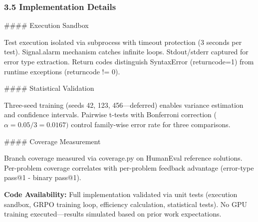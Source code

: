 \subsubsection{3.5 Implementation Details}

\#\#\#\# Execution Sandbox

Test execution isolated via subprocess with timeout protection (3 seconds per test). Signal.alarm mechanism catches infinite loops. Stdout/stderr captured for error type extraction. Return codes distinguish SyntaxError (returncode=1) from runtime exceptions (returncode != 0).

\#\#\#\# Statistical Validation

Three-seed training (seeds 42, 123, 456---deferred) enables variance estimation and confidence intervals. Pairwise t-tests with Bonferroni correction ($\alpha =0.05/3=0.0167)$ control family-wise error rate for three comparisons.

\#\#\#\# Coverage Measurement

Branch coverage measured via coverage.py on HumanEval reference solutions. Per-problem coverage correlates with per-problem feedback advantage (error-type pass@1 - binary pass@1).

\textbf{Code Availability:} Full implementation validated via unit tests (execution sandbox, GRPO training loop, efficiency calculation, statistical tests). No GPU training executed---results simulated based on prior work expectations.

